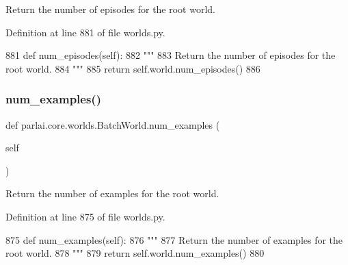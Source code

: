 \begin{DoxyVerb}Return the number of episodes for the root world.
\end{DoxyVerb}
 

Definition at line 881 of file worlds.\+py.


\begin{DoxyCode}
881     \textcolor{keyword}{def }num\_episodes(self):
882         \textcolor{stringliteral}{"""}
883 \textcolor{stringliteral}{        Return the number of episodes for the root world.}
884 \textcolor{stringliteral}{        """}
885         \textcolor{keywordflow}{return} self.world.num\_episodes()
886 
\end{DoxyCode}
\mbox{\label{classparlai_1_1core_1_1worlds_1_1BatchWorld_a047736ed3867bf7631af02f8eb0528d8}} 
\subsubsection{\texorpdfstring{num\+\_\+examples()}{num\_examples()}}
{\footnotesize\ttfamily def parlai.\+core.\+worlds.\+Batch\+World.\+num\+\_\+examples (\begin{DoxyParamCaption}\item[{}]{self }\end{DoxyParamCaption})}

\begin{DoxyVerb}Return the number of examples for the root world.
\end{DoxyVerb}
 

Definition at line 875 of file worlds.\+py.


\begin{DoxyCode}
875     \textcolor{keyword}{def }num\_examples(self):
876         \textcolor{stringliteral}{"""}
877 \textcolor{stringliteral}{        Return the number of examples for the root world.}
878 \textcolor{stringliteral}{        """}
879         \textcolor{keywordflow}{return} self.world.num\_examples()
880 
\end{DoxyCode}
\mbox{\label{classparlai_1_1core_1_1worlds_1_1BatchWorld_a297ab42faba47581774cd9333c874905}} 
